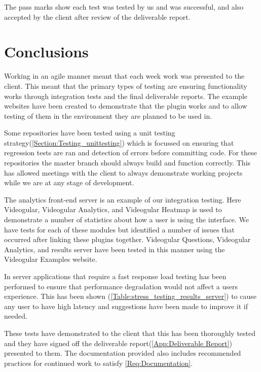 The pass marks show each test was tested by us and was successful, and also accepted by the client after review of the deliverable report.

\section{Conclusions}

Working in an agile manner meant that each week work was presented to the client. This meant that the primary types of testing are ensuring functionality works through integration tests and the final deliverable reports. The example websites have been created to demonstrate that the plugin works and to allow testing of them in the environment they are planned to be used in.

Some repositories have been tested using a unit testing strategy(\autoref{Section:Testing_unittesting}) which is focussed on ensuring that regression tests are ran and detection of errors before committing code. For these repositories the master branch should always build and function correctly. This has allowed meetings with the client to always demonstrate working projects while we are at any stage of development.

The analytics front-end server is an example of our integration testing. Here Videogular, Videogular Analytics, and Videogular Heatmap is used to demonstrate a number of statistics about how a user is using the interface. We have tests for each of these modules but identified a number of issues that occurred after linking these plugins together. Videogular Questions, Videogular Analytics, and results server have been tested in this manner using the Videogular Examples website.

In server applications that require a fast response load testing has been performed to ensure that performance degradation would not affect a users experience. This has been shown (\autoref{Table:stress_testing_results_server}) to cause any user to have high latency and suggestions have been made to improve it if needed.

These tests have demonstrated to the client that this has been thoroughly tested and they have signed off the deliverable report(\cref{App:Deliverable Report}) presented to them. The documentation provided also includes recommended practices for continued work to satisfy \cref{Req:Documentation}.